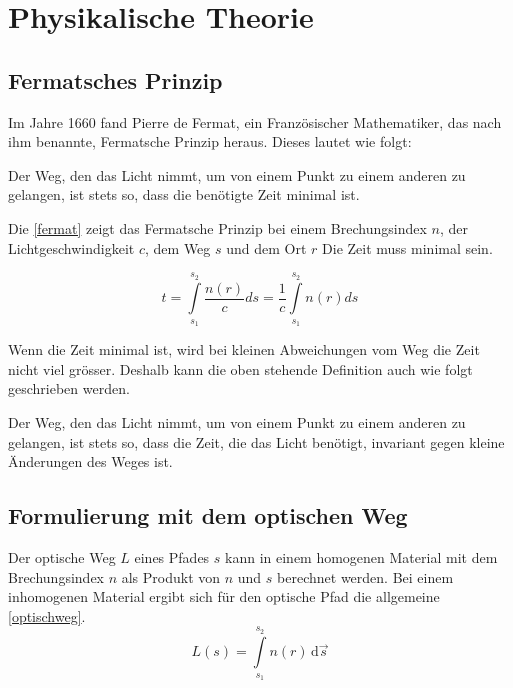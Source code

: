 \section{Physikalische Theorie}

\subsection{Fermatsches Prinzip}
Im Jahre 1660 fand Pierre de Fermat, 
ein Französischer Mathematiker, das 
nach ihm benannte, Fermatsche Prinzip heraus. 
Dieses lautet wie folgt\cite{Definition}:

\begin{definition}
	Der Weg, den das Licht nimmt, 
	um von einem Punkt zu einem anderen zu gelangen, 
	ist stets so, dass die benötigte Zeit minimal ist.
\end{definition}

Die \eqref{fermat} zeigt das Fermatsche Prinzip bei einem Brechungsindex $n$, 
der Lichtgeschwindigkeit $c$, dem Weg $s$ und dem Ort $r$ Die Zeit muss minimal sein.

\begin{equation}
	t= \int\limits_{s_1}^{s_2} \frac{n(r)}{c} ds = \frac{1}{c} \int\limits_{s_1}^{s_2} n(r) ds
	\label{fermat}
\end{equation}


Wenn die Zeit minimal ist, wird bei kleinen Abweichungen vom Weg die Zeit nicht viel grösser. 
Deshalb kann die oben stehende Definition auch wie folgt geschrieben werden\cite{Definition}.

\begin{definition}
	Der Weg, den das Licht nimmt, 
	um von einem Punkt zu einem anderen zu gelangen, 
	ist stets so, dass die Zeit, die das Licht benötigt, 
	invariant gegen kleine Änderungen des Weges ist.
\end{definition}

\subsection{Formulierung mit dem optischen Weg}
Der optische Weg $L$  eines Pfades $s$ kann in einem homogenen Material 
mit dem Brechungsindex $n$ als Produkt von $n$ und $s$ berechnet werden.
Bei einem inhomogenen Material ergibt sich für den optische Pfad die allgemeine \eqref{optischweg}.
\begin{equation}
	L(s) = \int\limits_{s_1}^{s_2} n(r) \,\mathrm d\vec s 
	\label{optischweg}
\end{equation}


